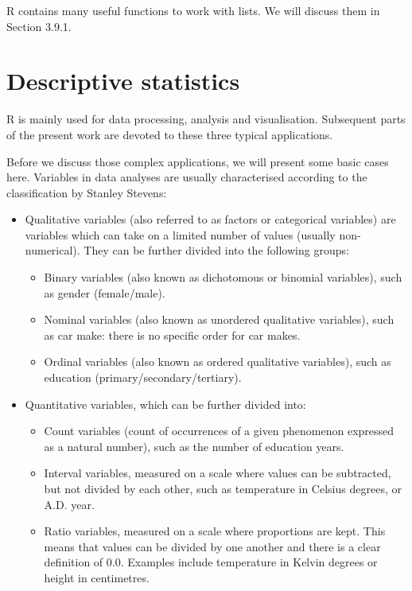 \documentclass[]{book}
\providecommand{\tightlist}{%
  \setlength{\itemsep}{0pt}\setlength{\parskip}{0pt}}
\theoremstyle{definition}
\theoremstyle{definition}
\theoremstyle{definition}
\theoremstyle{remark}
\begin{document}
R contains many useful functions to work with lists. We will discuss
them in Section 3.9.1.

\section{Descriptive statistics}\label{part_23}

R is mainly used for data processing, analysis and visualisation.
Subsequent parts of the present work are devoted to these three typical
applications.

Before we discuss those complex applications, we will present some basic
cases here. Variables in data analyses are usually characterised
according to the classification by Stanley Stevens:

\begin{itemize}
\tightlist
\item
  Qualitative variables (also referred to as factors or categorical
  variables) are variables which can take on a limited number of values
  (usually non-numerical). They can be further divided into the
  following groups:

  \begin{itemize}
  \tightlist
  \item
    Binary variables (also known as dichotomous or binomial variables),
    such as gender (female/male).
  \item
    Nominal variables (also known as unordered qualitative variables),
    such as car make: there is no specific order for car makes.
  \item
    Ordinal variables (also known as ordered qualitative variables),
    such as education (primary/secondary/tertiary).
  \end{itemize}
\item
  Quantitative variables, which can be further divided into:

  \begin{itemize}
  \tightlist
  \item
    Count variables (count of occurrences of a given phenomenon
    expressed as a natural number), such as the number of education
    years.
  \item
    Interval variables, measured on a scale where values can be
    subtracted, but not divided by each other, such as temperature in
    Celsius degrees, or A.D. year.
  \item
    Ratio variables, measured on a scale where proportions are kept.
    This means that values can be divided by one another and there is a
    clear definition of 0.0. Examples include temperature in Kelvin
    degrees or height in centimetres.
  \end{itemize}
\end{itemize}
\end{document}
